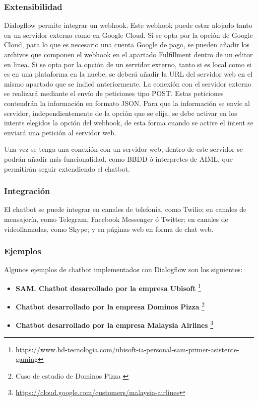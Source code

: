 \subsubsection*{Extensibilidad}

Dialogflow permite integrar un webhook. Este webhook puede estar alojado tanto en un servidor externo como en Google Cloud. Si se opta por la opción de Google Cloud, para lo que es necesario una cuenta Google de pago, se pueden añadir los archivos que componen el webhook en el apartado Fulfillment dentro de un editor en linea. Si se opta por la opción de un servidor externo, tanto si es local como si es en una plataforma en la nuebe, se deberá añadir la URL del servidor web en el mismo apartado que se indicó anteriormente. La conexión con el servidor externo se realizará mediante el envío de peticiones tipo POST. Estas peticiones contendrán la información en formato JSON. Para que la información se envíe al servidor, independientemente de la opción que se elija, se debe activar en los intents elegidos la opción del webhook, de esta forma cuando se active el intent se enviará una petición al servidor web.

Una vez se tenga una conexión con un servidor web, dentro de este servidor se podrán añadir más funcionalidad, como BBDD ó interpretes de AIML, que permitirán seguir extendiendo el chatbot.

\subsubsection*{Integración}

El chatbot se puede integrar en canales de telefonía, como Twilio; en canales de mensajería, como Telegram, Facebook Messenger ó Twitter; en canales de videollamadas, como Skype; y en páginas web en forma de chat web.

\subsubsection*{Ejemplos}

Algunos ejemplos de chatbot implementados con Dialogflow son los siguientes:

\begin{itemize}
    \item \textbf{SAM. Chatbot desarrollado por la empresa Ubisoft} \footnote{\url{https://www.hd-tecnologia.com/ubisoft-ia-personal-sam-primer-asistente-gaming}}
    \item \textbf{Chatbot desarrollado por la empresa Dominos Pizza} \footnote{Caso de estudio de Dominos Pizza \cite{RefWorks:RefID:10-domino's-case-study}}
    \item \textbf{Chatbot desarrollado por la empresa Malaysia Airlines} \footnote{\url{https://cloud.google.com/customers/malaysia-airlines}}
\end{itemize}


